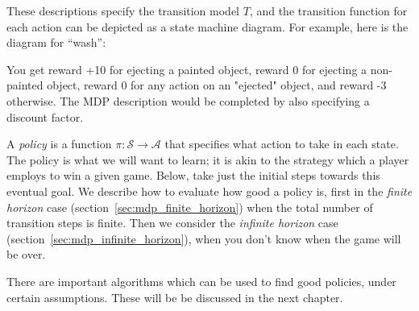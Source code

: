 \begin{examplebox}
\noindent
These descriptions specify the transition model $T$, and the
transition function for each action can be depicted as a state machine
diagram.  For example, here is the diagram for ``wash'':
%
%
\begin{center}
\end{center}

You get reward +10 for ejecting a painted object, reward 0 for
ejecting a non-painted object, reward 0 for any action on an "ejected"
object, and reward -3 otherwise.  The MDP description would be
completed by also specifying a discount factor.

\end{examplebox}



A {\it{policy}} is a function $\pi: \mathcal S \rightarrow \mathcal A$
that specifies what action to take in each state.  The policy is what
we will want to learn; it is akin to the strategy which a player
employs to win a given game.  Below, take just the initial steps
towards this eventual goal.  We describe how to evaluate how good a
policy is, first in the {\em finite horizon} case
(section~\ref{sec:mdp_finite_horizon}) when the total number of
transition steps is finite.  Then we consider the {\em infinite
  horizon} case (section~\ref{sec:mdp_infinite_horizon}), when you
don't know when the game will be over.

There are important algorithms which can be used to find good
policies, under certain assumptions.  These will be be discussed in
the next chapter.

